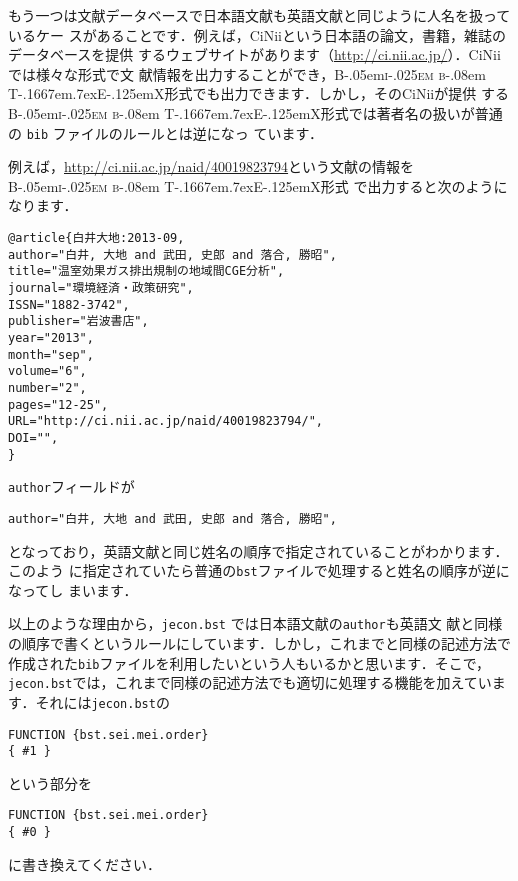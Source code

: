 \documentclass[article]{jlreq}
\newcommand{\BibTeX}{\textrm{B\kern-.05em\textsc{i\kern-.025em b}\kern-.08em%
T\kern-.1667em\lower.7ex\hbox{E}\kern-.125emX}}
\begin{document}
もう一つは文献データベースで日本語文献も英語文献と同じように人名を扱っているケー
スがあることです．例えば，CiNiiという日本語の論文，書籍，雑誌のデータベースを提供
するウェブサイトがあります（\url{http://ci.nii.ac.jp/}）．CiNiiでは様々な形式で文
献情報を出力することができ，\BibTeX 形式でも出力できます．しかし，そのCiNiiが提供
する \BibTeX 形式では著者名の扱いが普通の \texttt{bib} ファイルのルールとは逆になっ
ています．

例えば，\url{http://ci.nii.ac.jp/naid/40019823794}という文献の情報を \BibTeX 形式
で出力すると次のようになります．
\begin{screen}
\begin{verbatim}
@article{白井大地:2013-09,
author="白井, 大地 and 武田, 史郎 and 落合, 勝昭",
title="温室効果ガス排出規制の地域間CGE分析",
journal="環境経済・政策研究",
ISSN="1882-3742",
publisher="岩波書店",
year="2013",
month="sep",
volume="6",
number="2",
pages="12-25",
URL="http://ci.nii.ac.jp/naid/40019823794/",
DOI="",
}
\end{verbatim}
\end{screen}
\texttt{author}フィールドが
\begin{screen}
\begin{verbatim}
author="白井, 大地 and 武田, 史郎 and 落合, 勝昭",
\end{verbatim}
\end{screen}
となっており，英語文献と同じ姓名の順序で指定されていることがわかります．このよう
に指定されていたら普通の\texttt{bst}ファイルで処理すると姓名の順序が逆になってし
まいます．

\vspace*{1em}

以上のような理由から，\texttt{jecon.bst} では日本語文献の\texttt{author}も英語文
献と同様の順序で書くというルールにしています．しかし，これまでと同様の記述方法で
作成された\texttt{bib}ファイルを利用したいという人もいるかと思います．そこで，
\texttt{jecon.bst}では，これまで同様の記述方法でも適切に処理する機能を加えていま
す．それには\texttt{jecon.bst}の
\begin{screen}
\begin{verbatim}
FUNCTION {bst.sei.mei.order}
{ #1 }
\end{verbatim}
\end{screen}
という部分を
\begin{screen}
\begin{verbatim}
FUNCTION {bst.sei.mei.order}
{ #0 }
\end{verbatim}
\end{screen}
に書き換えてください．
\end{document}

